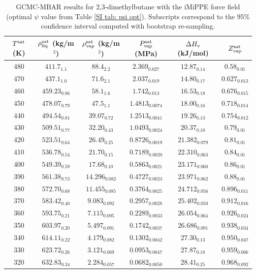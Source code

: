 \documentclass[journal=jctc,manuscript=article]{achemso}
\begin{document}
\begin{table}[htb!]
	\caption{GCMC-MBAR results for 2,3-dimethylbutane with the iMiPPE force field (optimal $\psi$ value from Table \ref{SI tab: psi opt}). Subscripts correspond to the 95\% confidence interval computed with bootstrap re-sampling.}
	\begin{center}
		\begin{tabular}{|c|c|c|c|c|c|}
			\hline
			$T^{\rm sat}$ (K) & $\rho_{\rm liq}^{\rm sat}$ (kg/m$^3$) & $\rho_{\rm vap}^{\rm sat}$ (kg/m$^3$) & $P_{\rm vap}^{\rm sat}$ (MPa) & $\Delta H_{\rm v}$ (kJ/mol) & $Z_{\rm vap}^{\rm sat}$ \\ \hline
			480 & $411.7_{1.1}$ & $88.4_{2.2}$ & $2.369_{0.027}$ & $12.87_{0.14}$ & $0.58_{0.01}$ \\
			470 & $437.1_{1.0}$ & $71.6_{2.1}$ & $2.037_{0.019}$ & $14.80_{0.17}$ & $0.627_{0.013}$ \\
			460 & $459.23_{0.86}$ & $58.1_{1.6}$ & $1.742_{0.013}$ & $16.53_{0.18}$ & $0.676_{0.015}$ \\
			450 & $478.07_{0.79}$ & $47.5_{1.1}$ & $1.4813_{0.0074}$ & $18.00_{0.16}$ & $0.718_{0.014}$ \\
			440 & $494.54_{0.81}$ & $39.07_{0.72}$ & $1.2513_{0.0041}$ & $19.26_{0.13}$ & $0.754_{0.012}$ \\
			430 & $509.51_{0.77}$ & $32.20_{0.43}$ & $1.0493_{0.0024}$ & $20.37_{0.10}$ & $0.79_{0.01}$ \\
			420 & $523.51_{0.64}$ & $26.49_{0.25}$ & $0.8726_{0.0019}$ & $21.382_{0.079}$ & $0.81_{0.01}$ \\
			410 & $536.78_{0.54}$ & $21.70_{0.15}$ & $0.7189_{0.0020}$ & $22.310_{0.063}$ & $0.84_{0.01}$ \\
			400 & $549.39_{0.59}$ & $17.68_{0.10}$ & $0.5863_{0.0021}$ & $23.171_{0.060}$ & $0.86_{0.01}$ \\
			390 & $561.38_{0.73}$ & $14.296_{0.082}$ & $0.4727_{0.0023}$ & $23.971_{0.062}$ & $0.88_{0.01}$ \\
			380 & $572.70_{0.68}$ & $11.455_{0.085}$ & $0.3764_{0.0025}$ & $24.712_{0.056}$ & $0.896_{0.011}$ \\
			370 & $583.42_{0.40}$ & $9.083_{0.092}$ & $0.2957_{0.0028}$ & $25.402_{0.050}$ & $0.912_{0.016}$ \\
			360 & $593.75_{0.21}$ & $7.115_{0.095}$ & $0.2289_{0.0033}$ & $26.054_{0.064}$ & $0.926_{0.024}$ \\
			350 & $603.97_{0.20}$ & $5.497_{0.091}$ & $0.1742_{0.0037}$ & $26.686_{0.091}$ & $0.938_{0.034}$ \\
			340 & $614.11_{0.22}$ & $4.179_{0.082}$ & $0.1302_{0.0042}$ & $27.30_{0.13}$ & $0.950_{0.047}$ \\
			330 & $623.72_{0.26}$ & $3.121_{0.069}$ & $0.0953_{0.0047}$ & $27.87_{0.18}$ & $0.959_{0.066}$ \\
			320 & $632.83_{0.34}$ & $2.284_{0.057}$ & $0.0682_{0.0050}$ & $28.41_{0.25}$ & $0.968_{0.092}$ \\
			\hline
		\end{tabular}
	\end{center}
\end{table}
\end{document}
